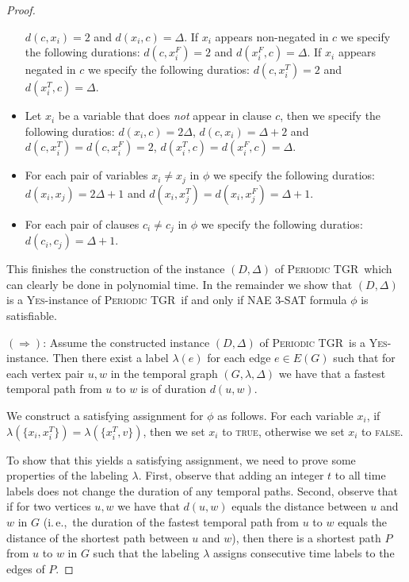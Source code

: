 \documentclass[a4paper,UKenglish,cleveref, autoref, thm-restate]{lipics-v2021}
\newcommand{\ie}{i.\,e.,\ }
\newcommand{\deltaExact}{\textsc{Periodic TGR}}
\begin{document}
\begin{proof}
\begin{itemize}
    $d(c,x_i)=2$ and $d(x_i,c)=\Delta$.
    If $x_i$ appears non-negated in $c$ we specify the following durations:
    $d(c,x_i^F)=2$ and $d(x_i^F,c)=\Delta$.
    If $x_i$ appears negated in $c$ we specify the following duratios:
    $d(c,x_i^T)=2$ and $d(x_i^T,c)=\Delta$.
    \item Let $x_i$ be a variable that does \emph{not} appear in clause $c$, then we specify the following duratios:
    $d(x_i,c)=2 \Delta$, $d(c,x_i)=\Delta + 2$
    and
    $d(c,x_i^T)=d(c,x_i^F)=2$, $d(x_i^T,c)=d(x_i^F,c)=\Delta$. 
    \item For each pair of variables $x_i \neq x_j$ in $\phi$ we specify the following duratios:
    $d(x_i,x_j)=2\Delta +1$ and
    $d(x_i,x_j^T)=d(x_i,x_j^F)=\Delta + 1$.
    \item For each pair of clauses $c_i \neq c_j$ in $\phi$ we specify the following duratios:
    $d(c_i,c_j)= \Delta + 1$.
\end{itemize}
This finishes the construction of the instance $(D,\Delta)$ of \deltaExact\, which can clearly be done in polynomial time. In the remainder we show that $(D,\Delta)$ is a \textsc{Yes}-instance of \deltaExact\ if and only if NAE 3-SAT formula $\phi$ is satisfiable.

$(\Rightarrow)$: Assume the constructed instance $(D,\Delta)$ of \deltaExact\ is a \textsc{Yes}-instance. 
Then there exist a label $\lambda(e)$ for each edge $e\in E(G)$ such that for each vertex pair $u,w$ in the temporal graph $(G,\lambda,\Delta)$ we have that a fastest temporal path from $u$ to $w$ is of duration $d(u,w)$. 

We construct a satisfying assignment for $\phi$ as follows. For each variable $x_i$, 
if $\lambda(\{x_i, x_i^T\})=\lambda(\{x_i^T, v\})$, then we set $x_i$ to \textsc{true}, otherwise we set $x_i$ to \textsc{false}.

To show that this yields a satisfying assignment, we need to prove some properties of the labeling $\lambda$.
First, observe that adding an integer $t$ to all time labels does not change the duration of any temporal paths. 
Second, observe that if for two vertices $u,w$ we have that $d(u,w)$ equals the distance between $u$ and $w$ in $G$
(\ie the duration of the fastest temporal path from $u$ to $w$ equals the distance of the shortest path between $u$ and $w$), 
then there is a shortest path $P$ from $u$ to $w$ in $G$ such that 
the labeling $\lambda$ assigns consecutive time labels to the edges of $P$.



\end{proof}
\end{document}
